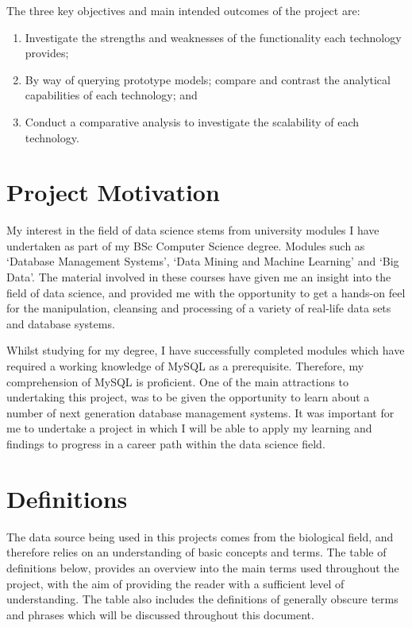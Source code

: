 The three key objectives and main intended outcomes of the project are:
\begin{enumerate}
\item Investigate the strengths and weaknesses of the functionality each technology provides;
\item By way of querying prototype models; compare and contrast the analytical capabilities of each technology; and
\item Conduct a comparative analysis to investigate the scalability of each technology.
\end{enumerate}

\section{Project Motivation}
My interest in the field of data science stems from university modules I have undertaken as part of my BSc Computer Science degree. Modules such as `Database Management Systems', `Data Mining and Machine Learning' and `Big Data'. The material involved in these courses have given me an insight into the field of data science, and provided me with the opportunity to get a hands-on feel for the manipulation, cleansing and processing of a variety of real-life data sets and database systems.

Whilst studying for my degree, I have successfully completed modules which have required a working knowledge of MySQL as a prerequisite. Therefore, my comprehension of MySQL is proficient. One of the main attractions to undertaking this project, was to be given the opportunity to learn about a number of next generation database management systems. It was important for me to undertake a project in which I will be able to apply my learning and findings to progress in a career path within the data science field.

\section{Definitions}
The data source being used in this projects comes from the biological field, and therefore relies on an understanding of basic concepts and terms. The table of definitions below, provides an overview into the main terms used throughout the project, with the aim of providing the reader with a sufficient level of understanding. The table also includes the definitions of generally obscure terms and phrases which will be discussed throughout this document.

